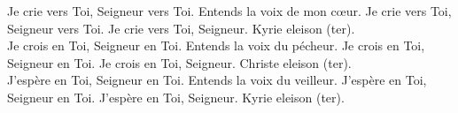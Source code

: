 Je crie vers Toi, Seigneur vers Toi. Entends la voix de mon cœur.
Je crie vers Toi, Seigneur vers Toi. Je crie vers Toi, Seigneur.
Kyrie eleison (ter).\\
Je crois en Toi, Seigneur en Toi. Entends la voix du pécheur.
Je crois en Toi, Seigneur en Toi. Je crois en Toi, Seigneur.
Christe eleison (ter).\\
J'espère en Toi, Seigneur en Toi. Entends la voix du veilleur.
J'espère en Toi, Seigneur en Toi. J'espère en Toi, Seigneur.
Kyrie eleison (ter).
